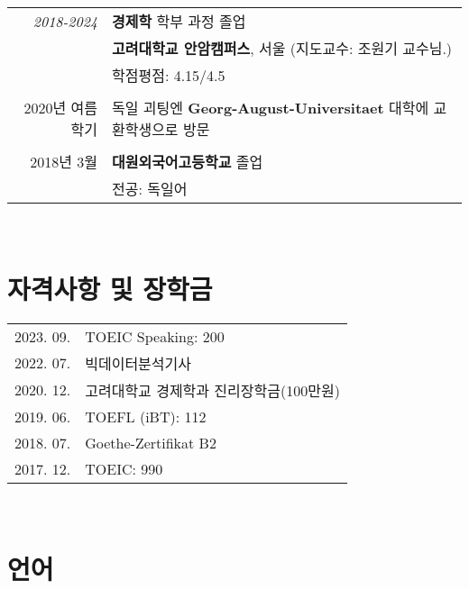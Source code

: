 \documentclass[a4paper]{article} %
\begin{document}
\begin{tabular}{rl}	

\emph{2018-2024} & \textbf{경제학} 학부 과정 졸업\\& \normalsize\textbf{고려대학교 안암캠퍼스}, 서울
\small (지도교수: 조원기 교수님.)\\
&\normalsize \textsc{학점평점}: 4.15/4.5\\
&\\


\textsc{2020년 여름학기} & 독일 괴팅엔
\textbf{Georg-August-Universitaet} 대학에
교환학생으로 방문\\
&\\


\textsc{2018년 3월}& \textbf{대원외국어고등학교} 졸업\\
& 전공: 독일어
\end{tabular}
\\
\section{자격사항 및 장학금}

\begin{tabular}{rl}
    2023. 09. &  TOEIC Speaking: 200\\

2022. 07. & 빅데이터분석기사\\
	
2020. 12. & 고려대학교 경제학과 진리장학금(100만원)\normalsize\\

2019. 06. & TOEFL (iBT): 112\\

2018. 07. & Goethe-Zertifikat B2\\

2017. 12. & TOEIC: 990
\end{tabular}
\\
\section{언어}
\end{document}
